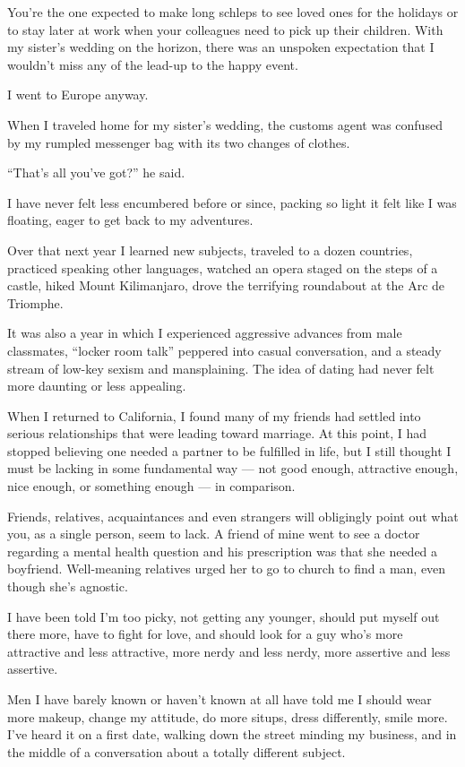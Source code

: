 You're the one expected to make long schleps to see loved ones for the
holidays or to stay later at work when your colleagues need to pick up
their children. With my sister's wedding on the horizon, there was an
unspoken expectation that I wouldn't miss any of the lead-up to the
happy event.

I went to Europe anyway.

When I traveled home for my sister's wedding, the customs agent was
confused by my rumpled messenger bag with its two changes of clothes.

``That's all you've got?'' he said.

I have never felt less encumbered before or since, packing so light it
felt like I was floating, eager to get back to my adventures.

Over that next year I learned new subjects, traveled to a dozen
countries, practiced speaking other languages, watched an opera staged
on the steps of a castle, hiked Mount Kilimanjaro, drove the terrifying
roundabout at the Arc de Triomphe.

It was also a year in which I experienced aggressive advances from male
classmates, ``locker room talk'' peppered into casual conversation, and
a steady stream of low-key sexism and mansplaining. The idea of dating
had never felt more daunting or less appealing.

When I returned to California, I found many of my friends had settled
into serious relationships that were leading toward marriage. At this
point, I had stopped believing one needed a partner to be fulfilled in
life, but I still thought I must be lacking in some fundamental way ---
not good enough, attractive enough, nice enough, or something enough ---
in comparison.

Friends, relatives, acquaintances and even strangers will obligingly
point out what you, as a single person, seem to lack. A friend of mine
went to see a doctor regarding a mental health question and his
prescription was that she needed a boyfriend. Well-meaning relatives
urged her to go to church to find a man, even though she's agnostic.

I have been told I'm too picky, not getting any younger, should put
myself out there more, have to fight for love, and should look for a guy
who's more attractive and less attractive, more nerdy and less nerdy,
more assertive and less assertive.

Men I have barely known or haven't known at all have told me I should
wear more makeup, change my attitude, do more situps, dress differently,
smile more. I've heard it on a first date, walking down the street
minding my business, and in the middle of a conversation about a totally
different subject.

